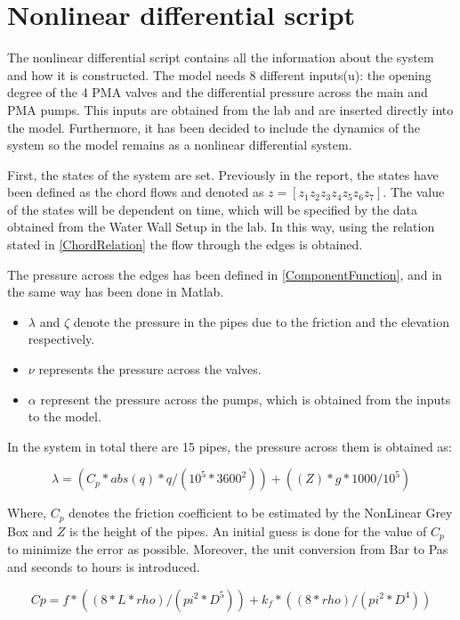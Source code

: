 \chapter{Nonlinear differential script}
\label{NLDS}
The nonlinear differential script contains all the information about the system and how it is constructed. The model needs 8 different inputs(u): 
the opening degree of the 4 PMA valves and the differential pressure across the main and PMA pumps. This inputs are obtained from the lab and are 
inserted directly into the model. Furthermore, it has been decided to include the dynamics of the system so the model remains as a nonlinear differential system. 

First, the states of the system are set. Previously in the report, the states have been defined as the chord flows and denoted as $z = [z_1 z_2 z_3 z_4 z_5 z_6 
z_7]$. The value of the states will be dependent on time, which will be specified by the data obtained from the Water Wall Setup in the lab. In this way, using
the relation stated in \eqref{ChordRelation} the flow through the edges is obtained.

The pressure across the edges has been defined in \eqref{ComponentFunction}, and in the same way has been done in Matlab. 

\begin{itemize}
  \item $\lambda$ and $\zeta$ denote the pressure in the pipes due to the friction and the elevation respectively.
  \item $\nu$ represents the pressure across the valves.
  \item $\alpha$ represent the pressure across the pumps, which is obtained from the inputs to the model.
\end{itemize}

In the system in total there are 15 pipes, the pressure across them is obtained as: 

\begin{equation}
\lambda = (C_p * abs(q)*q /(10^5*3600^2)) + ((Z)*g*1000/10^5)
\end{equation}

Where, $C_p$ denotes the friction coefficient to be estimated by the NonLinear Grey Box and $Z$ is the height of the pipes. An initial guess is done for the value of $C_p$ to minimize the error 
as possible. Moreover, the unit conversion from Bar to Pas and seconds to hours is introduced.

\begin{equation}
  Cp= f*((8*L*rho)/(pi^2*D^5))+k_f*((8*rho)/(pi^2*D^4))
\end{equation}

